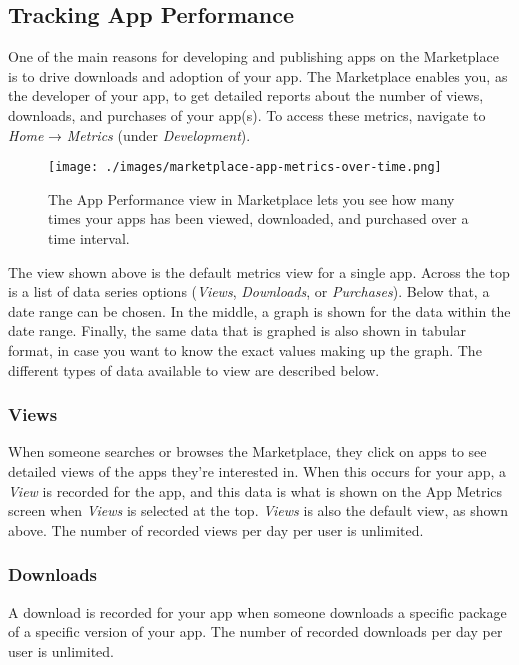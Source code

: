 \subsection{Tracking App Performance}\label{tracking-app-performance}

One of the main reasons for developing and publishing apps on the
Marketplace is to drive downloads and adoption of your app. The
Marketplace enables you, as the developer of your app, to get detailed
reports about the number of views, downloads, and purchases of your
app(s). To access these metrics, navigate to \emph{Home} →
\emph{Metrics} (under \emph{Development}).

\begin{figure}
\centering
\texttt{[image: ./images/marketplace-app-metrics-over-time.png]}
\caption{The App Performance view in Marketplace lets you see how many
times your apps has been viewed, downloaded, and purchased over a time
interval.}
\end{figure}

The view shown above is the default metrics view for a single app.
Across the top is a list of data series options (\emph{Views},
\emph{Downloads}, or \emph{Purchases}). Below that, a date range can be
chosen. In the middle, a graph is shown for the data within the date
range. Finally, the same data that is graphed is also shown in tabular
format, in case you want to know the exact values making up the graph.
The different types of data available to view are described below.

\subsubsection{Views}\label{views}

When someone searches or browses the Marketplace, they click on apps to
see detailed views of the apps they're interested in. When this occurs
for your app, a \emph{View} is recorded for the app, and this data is
what is shown on the App Metrics screen when \emph{Views} is selected at
the top. \emph{Views} is also the default view, as shown above. The
number of recorded views per day per user is unlimited.

\subsubsection{Downloads}\label{downloads}

A download is recorded for your app when someone downloads a specific
package of a specific version of your app. The number of recorded
downloads per day per user is unlimited.

